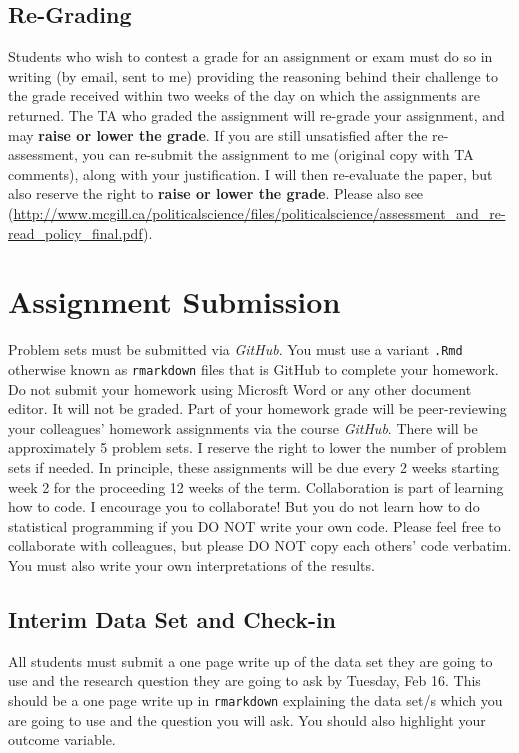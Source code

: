 \documentclass[11pt,]{article}
\begin{document}
\subsection{Re-Grading}\label{re-grading}

Students who wish to contest a grade for an assignment or exam must do
so in writing (by email, sent to me) providing the reasoning behind
their challenge to the grade received within two weeks of the day on
which the assignments are returned. The TA who graded the assignment
will re-grade your assignment, and may \textbf{raise or lower the
grade}. If you are still unsatisfied after the re-assessment, you can
re-submit the assignment to me (original copy with TA comments), along
with your justification. I will then re-evaluate the paper, but also
reserve the right to \textbf{raise or lower the grade}. Please also see
(\url{http://www.mcgill.ca/politicalscience/files/politicalscience/assessment_and_re-read_policy_final.pdf}).

\section{Assignment Submission}\label{assignment-submission}

Problem sets must be submitted via \emph{GitHub}. You must use a variant
\texttt{.Rmd} otherwise known as \texttt{rmarkdown} files that is GitHub
to complete your homework. Do not submit your homework using Microsft
Word or any other document editor. It will not be graded. Part of your
homework grade will be peer-reviewing your colleagues' homework
assignments via the course \emph{GitHub}. There will be approximately 5
problem sets. I reserve the right to lower the number of problem sets if
needed. In principle, these assignments will be due every 2 weeks
starting week 2 for the proceeding 12 weeks of the term. Collaboration
is part of learning how to code. I encourage you to collaborate! But you
do not learn how to do statistical programming if you DO NOT write your
own code. Please feel free to collaborate with colleagues, but please DO
NOT copy each others' code verbatim. You must also write your own
interpretations of the results.

\subsection{Interim Data Set and
Check-in}\label{interim-data-set-and-check-in}

All students must submit a one page write up of the data set they are
going to use and the research question they are going to ask by Tuesday,
Feb 16. This should be a one page write up in \texttt{rmarkdown}
explaining the data set/s which you are going to use and the question
you will ask. You should also highlight your outcome variable.
\end{document}
